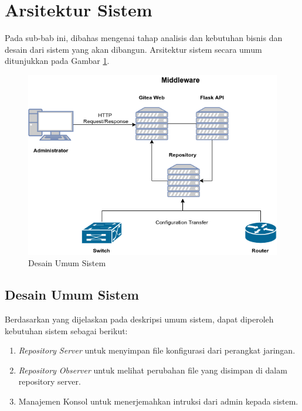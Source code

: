 	\section{Arsitektur Sistem}
		Pada sub-bab ini, dibahas mengenai tahap analisis dan kebutuhan bisnis dan desain dari sistem yang akan dibangun. Arsitektur sistem secara umum ditunjukkan pada Gambar \ref{DesainUmumSistem}.\\
		\begin{figure}[H]
			\centering
			\includegraphics[width=\textwidth]{Images/C-3/Desain-Umum-TA-2.png}
			\caption{Desain Umum Sistem}
			\label{DesainUmumSistem}
		\end{figure}

		\subsection{Desain Umum Sistem}
			Berdasarkan yang dijelaskan pada deskripsi umum sistem, dapat diperoleh kebutuhan sistem sebagai berikut:
			\begin{enumerate}
				\item \textit{Repository Server} untuk menyimpan file konfigurasi dari perangkat jaringan.
				\item \textit{Repository Observer} untuk melihat perubahan file yang disimpan di dalam repository server.
				\item Manajemen Konsol untuk menerjemahkan intruksi dari admin kepada sistem.
			\end{enumerate}
                
                
